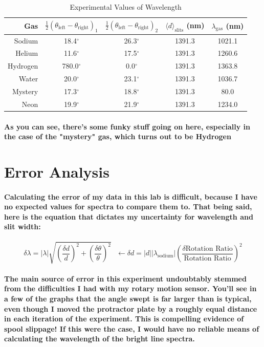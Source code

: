 \documentclass[11.8pt]{amsart}
\begin{document}
\begin{table}[H]
\centering
{}
\caption{Experimental Values of Wavelength}
\label{my-label}
\begin{tabular}{r|c|c|c|c}
Gas      & $\frac{1}{2}(\theta_\text{left}-\theta_\text{right})_1$ & $\frac{1}{2}(\theta_\text{left}-\theta_\text{right})_2$ & $\langle d \rangle_\text{slits}$ (nm)  & $\lambda_\text{gas}$ (nm) \\\hline
Sodium   & 18.4$^{\circ}$            & 26.3$^{\circ}$            & 1391.3 & 1021.1   \\
Helium   & 11.6$^{\circ}$            & 17.5$^{\circ}$            & 1391.3 & 1260.6   \\
Hydrogen & 780.0$^{\circ}$            & 0.0$^{\circ}$            & 1391.3 & 1363.8    \\
Water    & 20.0$^{\circ}$            & 23.1$^{\circ}$            & 1391.3 & 1036.7    \\
Mystery  & 17.3$^{\circ}$            & 18.8$^{\circ}$            & 1391.3 & 80.0      \\
Neon     & 19.9$^{\circ}$            & 21.9$^{\circ}$            & 1391.3 & 1234.0
\end{tabular}
\end{table}
\paragraph{As you can see, there's some funky stuff going on here, especially in the case of the "mystery" gas, which turns out to be Hydrogen}

\section{Error Analysis}
\paragraph{Calculating the error of my data in this lab is difficult, because I have no expected values for spectra to compare them to. That being said, here is the equation that dictates my uncertainty for wavelength and slit width:}
\begin{equation*}
    \delta \lambda = |\lambda|\sqrt{\left(\frac{\delta d}{d}\right)^2+\left(\frac{\delta \theta}{\theta}\right)^2}
    \ \ \ \leftarrow
    \delta d = |d||\lambda_\text{sodium}|\left( \frac{\delta \text{Rotation Ratio}} {\text{Rotation Ratio}} \right)^2
\end{equation*}
\paragraph{The main source of error in this experiment undoubtably stemmed from the difficulties I had with my rotary motion sensor. You'll see in a few of the graphs that the angle swept is far larger than is typical, even though I moved the protractor plate by a roughly equal distance in each iteration of the experiment. This is compelling evidence of spool slippage! If this were the case, I would have no reliable means of calculating the wavelength of the bright line spectra.  }
\end{document}
